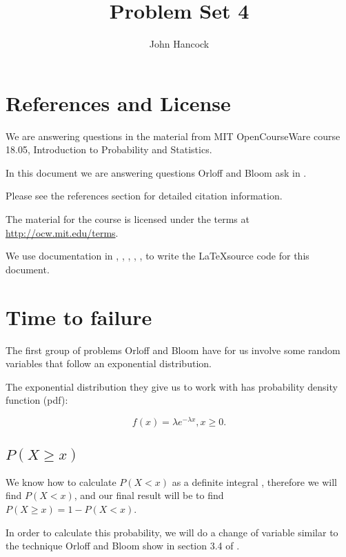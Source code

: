 \documentclass[a4paper,11pt]{article}
\author{John Hancock}
\title{Problem Set 4}
\begin{document}
\maketitle
\tableofcontents
\section{References and License}
We are answering questions in the material from MIT OpenCourseWare
course 18.05, Introduction to Probability and Statistics.

In this document we are answering questions Orloff and Bloom ask in
\cite{slides7}.

Please see the references section for detailed citation information.

The material for the course is licensed under the terms at
\url{http://ocw.mit.edu/terms}.

We use documentation in  \cite{logicNot}, \cite{proofs}, \cite{bars},
\cite{packageClash}, \cite{curlyBrace}, \cite{cases} to write the \LaTeX source code for this document.

\section{Time to failure}
The first group of problems Orloff and Bloom have for us involve some
random variables that follow an exponential distribution.

The exponential distribution they give us to work with has probability
density function (pdf):

\begin{equation}
f\left(x \right) = \lambda e^{-\lambda x}, x \geq 0.
\end{equation}



\subsection{$P\left(X \geq x \right)$}

We know how to calculate $P\left(X < x \right)$ as a definite integral
\cite{reading5b}, therefore we will find 
$P\left( X < x \right)$, and our final result will be to find
$P\left(X \geq x \right) = 1 - P\left( X < x \right)$.

In order to calculate this probability, we will do a change of variable
similar to the technique Orloff and Bloom show in section 3.4 of
\cite{reading7}.
\end{document}
